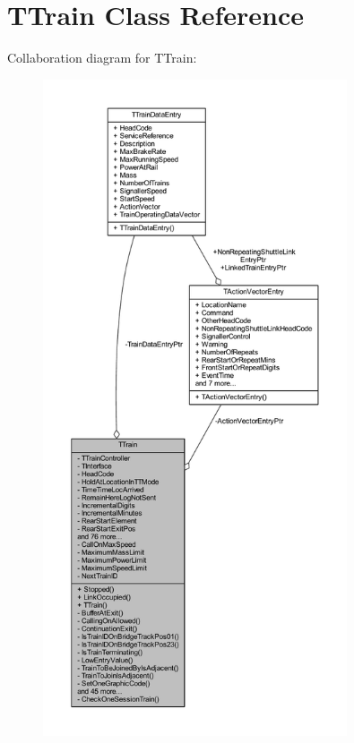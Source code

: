 \hypertarget{class_t_train}{}\section{T\+Train Class Reference}
\label{class_t_train}


Collaboration diagram for T\+Train\+:\nopagebreak
\begin{figure}[H]
\begin{center}
\leavevmode
\includegraphics[height=550pt]{class_t_train__coll__graph}
\end{center}
\end{figure}
